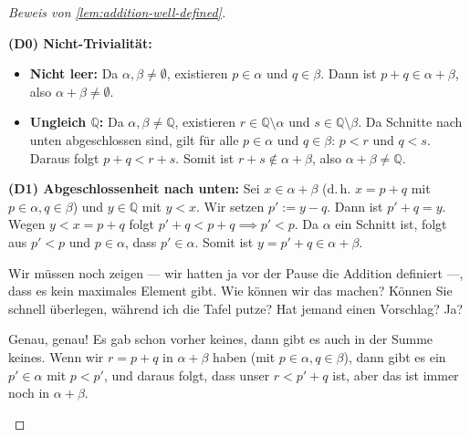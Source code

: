 \begin{proof}[Beweis von \cref{lem:addition-well-defined}]
\begin{math-stroke}
\textbf{(D0) Nicht-Trivialität:}
\begin{itemize}
    \item \textbf{Nicht leer:} Da $\alpha, \beta \neq \emptyset$, existieren $p \in \alpha$ und $q \in \beta$. Dann ist $p + q \in \alpha + \beta$, also $\alpha + \beta \neq \emptyset$.
    \item \textbf{Ungleich $\mathbb{Q}$:} Da $\alpha, \beta \neq \mathbb{Q}$, existieren $r \in \mathbb{Q} \setminus \alpha$ und $s \in \mathbb{Q} \setminus \beta$. Da Schnitte nach unten abgeschlossen sind, gilt für alle $p \in \alpha$ und $q \in \beta$: $p < r$ und $q < s$. Daraus folgt $p + q < r + s$. Somit ist $r + s \notin \alpha + \beta$, also $\alpha + \beta \neq \mathbb{Q}$.
\end{itemize}
\end{math-stroke}

\begin{math-stroke}
\textbf{(D1) Abgeschlossenheit nach unten:} Sei $x \in \alpha + \beta$ (d.\,h. $x = p + q$ mit $p \in \alpha, q \in \beta$) und $y \in \mathbb{Q}$ mit $y < x$. Wir setzen $p' := y - q$. Dann ist $p' + q = y$. Wegen $y < x = p + q$ folgt $p' + q < p + q \implies p' < p$. Da $\alpha$ ein Schnitt ist, folgt aus $p' < p$ und $p \in \alpha$, dass $p' \in \alpha$. Somit ist $y = p' + q \in \alpha + \beta$.
\end{math-stroke}

\begin{spoken-clean}[00:55:30 - 00:57:15]
Wir müssen noch zeigen --- wir hatten ja vor der Pause die Addition definiert ---, dass es kein maximales Element gibt. Wie können wir das machen? Können Sie schnell überlegen, während ich die Tafel putze? Hat jemand einen Vorschlag? Ja?
\end{spoken-clean}

\begin{student-interaction}
Genau, genau! Es gab schon vorher keines, dann gibt es auch in der Summe keines. Wenn wir $r = p + q$ in $\alpha + \beta$ haben (mit $p \in \alpha, q \in \beta$), dann gibt es ein $p' \in \alpha$ mit $p < p'$, und daraus folgt, dass unser $r < p' + q$ ist, aber das ist immer noch in $\alpha + \beta$.
\end{student-interaction}


\end{proof}
